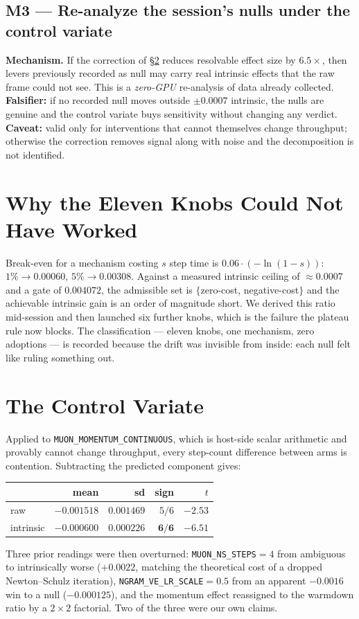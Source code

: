 \documentclass{article}
\begin{document}
\subsection{M3 --- Re-analyze the session's nulls under the control variate}
\textbf{Mechanism.} If the correction of \S\ref{sec:cv} reduces resolvable effect size by $6.5\times$, then levers previously recorded as null may carry real intrinsic effects that the raw frame could not see. This is a \emph{zero-GPU} re-analysis of data already collected.
\textbf{Falsifier:} if no recorded null moves outside $\pm0.0007$ intrinsic, the nulls are genuine and the control variate buys sensitivity without changing any verdict.
\textbf{Caveat:} valid only for interventions that cannot themselves change throughput; otherwise the correction removes signal along with noise and the decomposition is not identified.

\section{Why the Eleven Knobs Could Not Have Worked}
\label{sec:knobs}
Break-even for a mechanism costing $s$ step time is $0.06\cdot(-\ln(1-s))$: $1\% \to 0.00060$, $5\% \to 0.00308$. Against a measured intrinsic ceiling of $\approx 0.0007$ and a gate of $0.004072$, the admissible set is $\{$zero-cost, negative-cost$\}$ and the achievable intrinsic gain is an order of magnitude short. We derived this ratio mid-session and then launched six further knobs, which is the failure the plateau rule now blocks. The classification --- eleven knobs, one mechanism, zero adoptions --- is recorded because the drift was invisible from inside: each null felt like ruling something out.

\section{The Control Variate}
\label{sec:cv}
Applied to \texttt{MUON\_MOMENTUM\_CONTINUOUS}, which is host-side scalar arithmetic and provably cannot change throughput, every step-count difference between arms is contention. Subtracting the predicted component gives:
\begin{center}\begin{small}
\begin{tabular}{lrrrr}
\toprule
 & mean & sd & sign & $t$ \\
\midrule
raw & $-0.001518$ & $0.001469$ & $5/6$ & $-2.53$ \\
intrinsic & $-0.000600$ & $\mathbf{0.000226}$ & $\mathbf{6/6}$ & $-6.51$ \\
\bottomrule
\end{tabular}
\end{small}\end{center}
Three prior readings were then overturned: \texttt{MUON\_NS\_STEPS}$=4$ from ambiguous to intrinsically worse ($+0.0022$, matching the theoretical cost of a dropped Newton--Schulz iteration), \texttt{NGRAM\_VE\_LR\_SCALE}$=0.5$ from an apparent $-0.0016$ win to a null ($-0.000125$), and the momentum effect reassigned to the warmdown ratio by a $2\times2$ factorial. Two of the three were our own claims.
\end{document}
